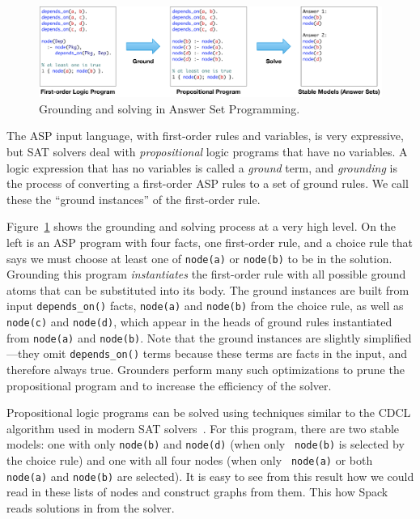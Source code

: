 \begin{figure}[t]
  \centering
  \includegraphics[width=.95\textwidth]{figures/asp-grounding.pdf}
  \caption{
    Grounding and solving in Answer Set Programming.
    \label{fig:ground-solve}
  }
\end{figure}

The ASP input language, with first-order rules and variables, is very expressive, but
SAT solvers deal with {\it propositional} logic programs that have no variables. A logic
expression that has no variables is called a {\it ground} term, and {\it grounding} is
the process of converting a first-order ASP rules to a set of ground rules. We call
these the ``ground instances'' of the first-order rule.

Figure~\ref{fig:ground-solve} shows the grounding and solving process at a very high
level. On the left is an ASP program with four facts, one first-order rule, and a choice
rule that says we must choose at least one of {\tt node(a)} or {\tt node(b)} to be in
the solution. Grounding this program {\it instantiates} the first-order rule with all
possible ground atoms that can be substituted into its body. The ground instances are
built from input {\tt depends\_on()} facts, {\tt node(a)} and {\tt node(b)} from the
choice rule, as well as {\tt node(c)} and {\tt node(d)}, which appear in the heads of
ground rules instantiated from {\tt node(a)} and {\tt node(b)}. Note that the ground
instances are slightly simplified---they omit {\tt depends\_on()} terms because these
terms are facts in the input, and therefore always true. Grounders perform many such
optimizations to prune the propositional program and to increase the efficiency of the
solver.

Propositional logic programs can be solved using techniques similar to the CDCL
algorithm used in modern SAT solvers~\cite{gebser+:asp-book}. For this program, there
are two stable models: one with only {\tt node(b)} and {\tt node(d)} (when only {\tt
  node(b)} is selected by the choice rule) and one with all four nodes (when only {\tt
  node(a)} or both {\tt node(a)} and {\tt node(b)} are selected). It is easy to see from
this result how we could read in these lists of nodes and construct graphs from them.
This how Spack reads solutions in from the solver.

